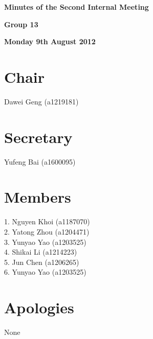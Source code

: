 \documentclass[11pt, a4paper]{article}
\begin{document}
 



\vspace*{15pt}

\begin{center}
\huge \bf Minutes of the Second Internal Meeting
\end{center}


\begin{center}
\Large \bf Group 13
\end{center}

\begin{center}
\Large \bf Monday 9th August 2012
\end{center}

\section*{Chair}
 Dawei Geng (a1219181)

\section*{Secretary}
Yufeng Bai (a1600095)

\section*{Members}
1. Nguyen Khoi (a1187070)\\
2. Yatong Zhou (a1204471)\\
3. Yunyao Yao (a1203525)\\
4. Shikai Li (a1214223)\\
5. Jun Chen (a1206265)\\
6. Yunyao Yao (a1203525)
\vspace*{10pt}

\section*{Apologies}
None
\end{document}
